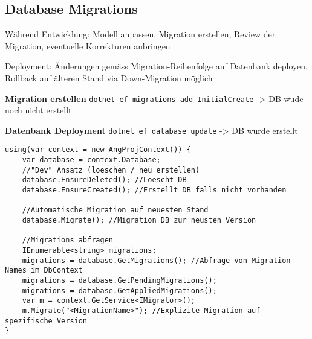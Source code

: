 \subsection{Database Migrations}
Während Entwicklung:
Modell anpassen, Migration erstellen, Review der Migration, eventuelle Korrekturen anbringen

Deployment:
Änderungen gemäss Migration-Reihenfolge auf Datenbank deployen, Rollback auf älteren Stand via Down-Migration möglich

\textbf{Migration erstellen}
\lstinline{dotnet ef migrations add InitialCreate}
-> DB wude noch nicht erstellt

\textbf{Datenbank Deployment}
\lstinline{dotnet ef database update}
-> DB wurde erstellt

\begin{lstlisting}
using(var context = new AngProjContext()) {
    var database = context.Database;
    //"Dev" Ansatz (loeschen / neu erstellen)
    database.EnsureDeleted(); //Loescht DB
    database.EnsureCreated(); //Erstellt DB falls nicht vorhanden
    
    //Automatische Migration auf neuesten Stand
    database.Migrate(); //Migration DB zur neusten Version
    
    //Migrations abfragen
    IEnumerable<string> migrations;
    migrations = database.GetMigrations(); //Abfrage von Migration-Names im DbContext
    migrations = database.GetPendingMigrations();
    migrations = database.GetAppliedMigrations();
    var m = context.GetService<IMigrator>(); 
    m.Migrate("<MigrationName>"); //Explizite Migration auf spezifische Version
}
\end{lstlisting}


\pagebreak